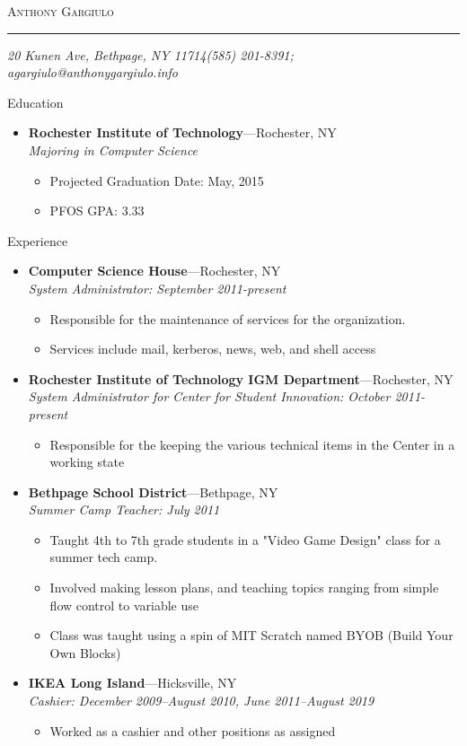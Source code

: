 \documentclass[11pt,oneside]{article}
\makeatletter
\newcommand{\name}{Anthony Gargiulo}
\newcommand{\addr}{20 Kunen Ave, Bethpage, NY 11714}
\newcommand{\phone}{(585) 201-8391}
\newcommand{\email}{agargiulo@anthonygargiulo.info}
\newcommand{\bigname}[1]{
	\begin{center}\fontfamily{phv}\selectfont\Huge\scshape#1\end{center}
}
\newenvironment{ressection}[1]{
	\vspace{3pt}
	{\fontfamily{phv}\selectfont\Large#1}
	\begin{itemize}
	\vspace{2pt}
}{
	\end{itemize}
}
\newcommand{\ressubitem}[1]{
	\vspace{-1pt}
	\item \begin{flushleft} #1 \end{flushleft}
}
\newcommand{\resbigitem}[3]{
	\vspace{-4pt}
	\item
	\textbf{#1}---#2 \\
	\textit{#3}
}
\newenvironment{ressubsec}[3]{
	\resbigitem{#1}{#2}{#3}
	\vspace{-1pt}
	\begin{itemize}
}{
	\end{itemize}
}
\makeatother
\begin{document}
 \selectfont

\bigname{\name}

\vspace{-4pt} \rule{\textwidth}{1pt}

\vspace{-1pt} {\small\itshape \addr \hfill \phone; \email}

\vspace{7 pt}




\begin{ressection}{Education}

	\begin{ressubsec}{Rochester Institute of Technology}{Rochester, NY}{Majoring in Computer Science}
		\ressubitem{Projected Graduation Date: May, 2015}
		\ressubitem{PFOS GPA: 3.33}
	\end{ressubsec}

\end{ressection}


\begin{ressection}{Experience}

	\begin{ressubsec}{Computer Science House}{Rochester, NY}{System Administrator: September 2011-present}
		\ressubitem{Responsible for the maintenance of services for the organization.}
		\ressubitem{Services include mail, kerberos, news, web, and shell access}
	\end{ressubsec}
	\begin{ressubsec}{Rochester Institute of Technology IGM Department}{Rochester, NY}{System Administrator for Center for Student Innovation: October 2011-present}
		\ressubitem{Responsible for the keeping the various technical items in the Center in a working state}
	\end{ressubsec}
	\begin{ressubsec}{Bethpage School District}{Bethpage, NY}{Summer Camp Teacher: July 2011}
		\ressubitem{Taught 4th to 7th grade students in a "Video Game Design" class for a summer tech camp.}
		\ressubitem{Involved making lesson plans, and teaching topics ranging from simple flow control to variable use}
		\ressubitem{Class was taught using a spin of MIT Scratch named BYOB (Build Your Own Blocks)}
	\end{ressubsec}

	\begin{ressubsec}{IKEA Long Island}{Hicksville, NY}{Cashier: December 2009--August 2010, June 2011--August 2019}
		\ressubitem{Worked as a cashier and other positions as assigned}
	\end{ressubsec}

\end{ressection}
\end{document}

